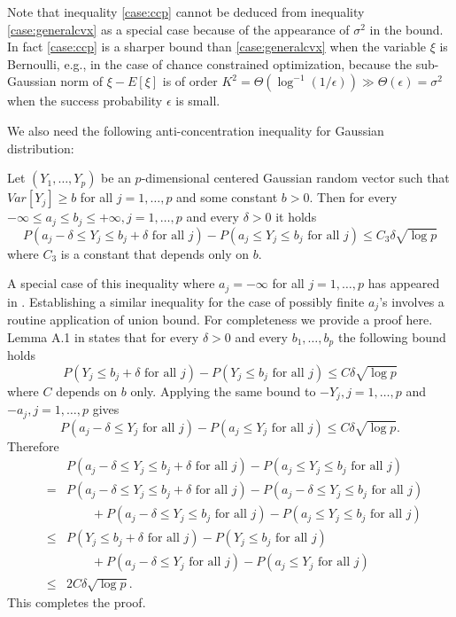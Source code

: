\documentclass[mnsc,blindrev]{informs4} %
\begin{document}
Note that inequality \eqref{case:ccp} cannot be deduced from inequality \eqref{case:generalcvx} as a special case because of the appearance of $\sigma^2$ in the bound. In fact \eqref{case:ccp} is a sharper bound than \eqref{case:generalcvx} when the variable $\xi$ is Bernoulli, e.g., in the case of chance constrained optimization, because the sub-Gaussian norm of $\xi-E[\xi]$ is of order $K^2=\Theta(\log^{-1}(1/\epsilon))\gg \Theta(\epsilon)=\sigma^2$ when the success probability $\epsilon$ is small.

We also need the following anti-concentration inequality for Gaussian distribution:
\begin{lemma}\label{anti-concentration}
Let $(Y_1,\ldots,Y_p)$ be an $p$-dimensional centered Gaussian random vector such that $Var[Y_j]\geq b$ for all $j=1,\ldots,p$ and some constant $b>0$. Then for every $-\infty\leq a_j\leq b_j\leq +\infty,j=1,\ldots,p$ and every $\delta>0$ it holds
\begin{equation*}
P(a_j-\delta\leq Y_j\leq b_j+\delta\text{ for all }j)-P(a_j\leq Y_j\leq b_j\text{ for all }j)\leq C_3\delta\sqrt{\log p}
\end{equation*}
where $C_3$ is a constant that depends only on $b$.
\end{lemma}
A special case of this inequality where $a_j=-\infty$ for all $j=1,\ldots,p$ has appeared in \cite{chernozhukov2017central}. Establishing a similar inequality for the case of possibly finite $a_j$'s involves a routine application of union bound. For completeness we provide a proof here.
Lemma A.1 in \cite{chernozhukov2017central} states that for every $\delta>0$ and every $b_1,\ldots,b_p$ the following bound holds
\begin{equation*}
P(Y_j\leq b_j+\delta\text{ for all }j)-P(Y_j\leq b_j\text{ for all }j)\leq C\delta\sqrt{\log p}
\end{equation*}
where $C$ depends on $b$ only. Applying the same bound to $-Y_j,j=1,\ldots,p$ and $-a_j,j=1,\ldots,p$ gives
\begin{equation*}
P(a_j-\delta\leq Y_j\text{ for all }j)-P(a_j\leq Y_j\text{ for all }j)\leq C\delta\sqrt{\log p}.
\end{equation*}
Therefore
\begin{eqnarray*}
&&P(a_j-\delta\leq Y_j\leq b_j+\delta\text{ for all }j)-P(a_j\leq Y_j\leq b_j\text{ for all }j)\\
&=&P(a_j-\delta\leq Y_j\leq b_j+\delta\text{ for all }j)-P(a_j-\delta\leq Y_j\leq b_j\text{ for all }j)\\
&&\hspace{2em}+P(a_j-\delta\leq Y_j\leq b_j\text{ for all }j)-P(a_j\leq Y_j\leq b_j\text{ for all }j)\\
&\leq&P(Y_j\leq b_j+\delta\text{ for all }j)-P( Y_j\leq b_j\text{ for all }j)\\
&&\hspace{2em}+P(a_j-\delta\leq Y_j\text{ for all }j)-P(a_j\leq Y_j\text{ for all }j)\\
&\leq&2C\delta\sqrt{\log p}.
\end{eqnarray*}
This completes the proof.\hfill\Halmos
\end{document}

